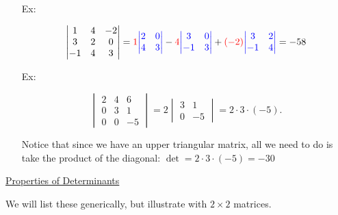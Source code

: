 \documentclass[reqno]{amsart}
\theoremstyle{definition}
\begin{document}
\begin{enumerate}
\item[Ex:  ]  

\begin{equation*}
\begin{vmatrix}
1 & 4 & -2\\
3 & 2 & 0\\
-1 & 4 & 3
\end{vmatrix} = {\color{red}1}{\color{blue}\begin{vmatrix}
2 & 0\\
4 & 3
\end{vmatrix}}
-  {\color{red}4}{\color{blue}\begin{vmatrix}
3 & 0\\
-1 & 3
\end{vmatrix}} + {\color{red}(-2)}{\color{blue}\begin{vmatrix}
3 & 2\\
-1 & 4
\end{vmatrix}} = -58
\end{equation*}

\item[Ex:  ]  

\begin{equation*}
\begin{vmatrix}
2 & 4 & 6\\
0 & 3 & 1\\
0 & 0 & -5
\end{vmatrix} = 2\begin{vmatrix}
3 & 1\\
0 & -5
\end{vmatrix} = 2\cdot 3\cdot (-5).
\end{equation*}

Notice that since we have an upper triangular matrix, all we need to do is take the product of the diagonal: $\det = 2\cdot 3\cdot (-5) = -30$

\end{enumerate}

\underline{Properties of Determinants}

We will list these generically, but illustrate with $2 \times 2$ matrices.
\end{document}
